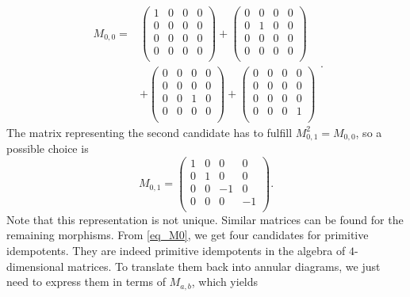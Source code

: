 \documentclass[aps,prb,twocolumn,superscriptaddress,noshowkeys]{revtex4-2}  %
\theoremstyle{plain}%
\theoremstyle{definition}
\theoremstyle{remark}
\begin{document}
\begin{equation}
	\begin{split}
		\label{eq_M0}
		M_{0,0}={}&
		\begin{pmatrix}
			1 & 0 & 0 & 0\\
			0 & 0 & 0 & 0\\
			0 & 0 & 0 & 0\\
			0 & 0 & 0 & 0\\
		\end{pmatrix}
		+\begin{pmatrix}
			0 & 0 & 0 & 0\\
			0 & 1 & 0 & 0\\
			0 & 0 & 0 & 0\\
			0 & 0 & 0 & 0\\
		\end{pmatrix}\\
		&+
		\begin{pmatrix}
			0 & 0 & 0 & 0\\
			0 & 0 & 0 & 0\\
			0 & 0 & 1 & 0\\
			0 & 0 & 0 & 0\\
		\end{pmatrix}
		+\begin{pmatrix}
			0 & 0 & 0 & 0\\
			0 & 0 & 0 & 0\\
			0 & 0 & 0 & 0\\
			0 & 0 & 0 & 1\\
		\end{pmatrix}
	\end{split}		.
\end{equation}
The matrix representing the second candidate has to fulfill $M_{0,1}^2=M_{0,0}$, so a possible choice is
\begin{equation}
	M_{0,1}=\begin{pmatrix}
		1 & 0 & 0 & 0\\
		0 & 1 & 0 & 0\\
		0 & 0 & -1 & 0\\
		0 & 0 & 0 & -1\\
	\end{pmatrix}.
\end{equation}
Note that this representation is not unique. Similar matrices can be found for the remaining morphisms.
From \eqref{eq_M0}, we get four candidates for primitive idempotents. They are indeed primitive idempotents in the algebra of $4$-dimensional matrices. To translate them back into annular diagrams, we just need to express them in terms of $M_{a,b}$, which yields
\end{document}
